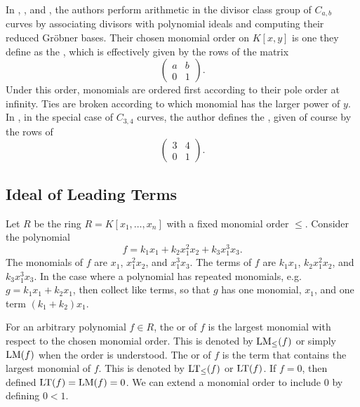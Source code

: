 In \cite{arita99}, \cite{arita03-1}, and \cite{harasawa00}, the authors perform arithmetic in the divisor class group of $C_{a,b}$ curves
by associating divisors with polynomial ideals and computing their reduced Gr\"obner bases.
Their chosen monomial order on $K[x,y]$ is one they define as the ,
which is effectively given by the rows of the matrix
\[ \begin{pmatrix} a & b \\ 0 & 1 \end{pmatrix}. \]
Under this order, monomials are ordered first according to their pole order at infinity.
Ties are broken according to which monomial has the larger power of $y$.
In \cite{arita03-2}, in the special case of $C_{3,4}$ curves, the author defines the ,
given of course by the rows of
\[ \begin{pmatrix} 3 & 4 \\ 0 & 1 \end{pmatrix}. \]




\subsection{Ideal of Leading Terms}

Let $R$ be the ring $R = K[x_1, \ldots, x_n]$ with a fixed monomial order $\leq$.
Consider the polynomial
\[ f = k_1x_1 + k_2x_1^2x_2 + k_3x_1^3x_3. \]
The monomials of $f$ are $x_1$, $x_1^2x_2$, and $x_1^3x_3$.
The terms of $f$ are $k_1x_1$, $k_2x_1^2x_2$, and $k_3x_1^3x_3$.
In the case where a polynomial has repeated monomials, e.g. $g = k_1x_1 + k_2x_1$,
then collect like terms, so that $g$ has one monomial, $x_1$, and one term $(k_1 + k_2)x_1$.

For an arbitrary polynomial $f \in R$,
the  or  of $f$ is the largest monomial with respect to the chosen monomial order.
This is denoted by $\operatorname{LM}_\leq(f)$ or simply $\operatorname{LM}(f)$ when the order is understood.
The  or  of $f$ is the term that contains the largest monomial of $f$.
This is denoted by $\operatorname{LT}_\leq(f)$ or $\operatorname{LT}(f)$.
If $f = 0$, then defined $\operatorname{LT}(f) = \operatorname{LM}(f) = 0$.
We can extend a monomial order to include 0 by defining $0 < 1$.

